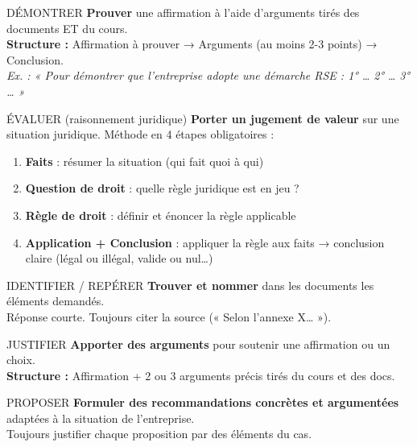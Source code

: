 \documentclass[11pt,a4paper]{article}
\begin{document}
\vspace{4pt}
\begin{verbebox}{DÉMONTRER}
\textbf{Prouver} une affirmation à l'aide d'arguments tirés des documents ET du cours.\\
\textbf{Structure :} Affirmation à prouver → Arguments (au moins 2-3 points) → Conclusion.\\
\textit{Ex. : « Pour démontrer que l'entreprise adopte une démarche RSE : 1° … 2° … 3° … »}
\end{verbebox}

\vspace{4pt}
\begin{verbebox}{ÉVALUER (raisonnement juridique)}
\textbf{Porter un jugement de valeur} sur une situation juridique. Méthode en 4 étapes obligatoires :\\
\begin{enumerate}
  \item \textbf{Faits} : résumer la situation (qui fait quoi à qui)
  \item \textbf{Question de droit} : quelle règle juridique est en jeu ?
  \item \textbf{Règle de droit} : définir et énoncer la règle applicable
  \item \textbf{Application + Conclusion} : appliquer la règle aux faits → conclusion claire (légal ou illégal, valide ou nul…)
\end{enumerate}
\end{verbebox}

\vspace{4pt}
\begin{verbebox}{IDENTIFIER / REPÉRER}
\textbf{Trouver et nommer} dans les documents les éléments demandés.\\
Réponse courte. Toujours citer la source (« Selon l'annexe X… »).
\end{verbebox}

\vspace{4pt}
\begin{verbebox}{JUSTIFIER}
\textbf{Apporter des arguments} pour soutenir une affirmation ou un choix.\\
\textbf{Structure :} Affirmation + 2 ou 3 arguments précis tirés du cours et des docs.
\end{verbebox}

\vspace{4pt}
\begin{verbebox}{PROPOSER}
\textbf{Formuler des recommandations concrètes et argumentées} adaptées à la situation de l'entreprise.\\
Toujours justifier chaque proposition par des éléments du cas.
\end{verbebox}
\end{document}
